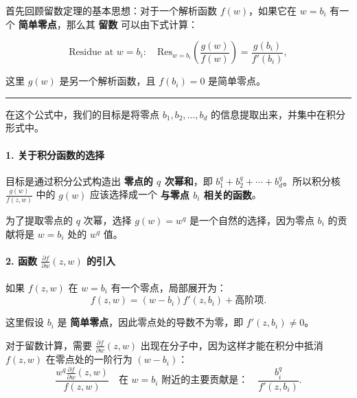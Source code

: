 \documentclass[lang=cn,zihao=-4,fontset=none,twoside]{fancybook}
\begin{document}
首先回顾留数定理的基本思想：对于一个解析函数 \(f(w)\)，如果它在
\(w = b_i\) 有一个 \textbf{简单零点}，那么其 \textbf{留数}
可以由下式计算：

\[
\text{Residue at } w = b_i: \quad \text{Res}_{w = b_i}\left(\frac{g(w)}{f(w)}\right) = \frac{g(b_i)}{f'(b_i)},
\]

这里 \(g(w)\) 是另一个解析函数，且 \(f(b_i) = 0\) 是简单零点。

\begin{center}\rule{0.5\linewidth}{0.5pt}\end{center}

在这个公式中，我们的目标是将零点 \(b_1, b_2, \dots, b_d\)
的信息提取出来，并集中在积分形式中。

\hypertarget{ux5173ux4e8eux79efux5206ux51fdux6570ux7684ux9009ux62e9}{%
\paragraph{1.
关于积分函数的选择}\label{ux5173ux4e8eux79efux5206ux51fdux6570ux7684ux9009ux62e9}}

目标是通过积分公式构造出 \textbf{零点的 \(q\) 次幂和}，即
\(b_1^q + b_2^q + \cdots + b_d^q\)。所以积分核 \(\frac{g(w)}{f(z, w)}\)
中的 \(g(w)\) 应该选择成一个 \textbf{与零点 \(b_i\) 相关的函数}。

为了提取零点的 \(q\) 次幂，选择 \(g(w) = w^q\)
是一个自然的选择，因为零点 \(b_i\) 的贡献将是 \(w = b_i\) 处的 \(w^q\)
值。

\hypertarget{ux51fdux6570-fracpartial-fpartial-wz-w-ux7684ux5f15ux5165}{%
\paragraph{\texorpdfstring{2. 函数
\(\frac{\partial f}{\partial w}(z, w)\)
的引入}{2. 函数 \textbackslash{}frac\{\textbackslash{}partial f\}\{\textbackslash{}partial w\}(z, w) 的引入}}\label{ux51fdux6570-fracpartial-fpartial-wz-w-ux7684ux5f15ux5165}}

如果 \(f(z, w)\) 在 \(w = b_i\) 有一个零点，局部展开为：
\[
f(z, w) = (w - b_i) f'(z, b_i) + \text{高阶项}.
\]

这里假设 \(b_i\) 是 \textbf{简单零点}，因此零点处的导数不为零，即
\(f'(z, b_i) \neq 0\)。

对于留数计算，需要 \(\frac{\partial f}{\partial w}(z, w)\)
出现在分子中，因为这样才能在积分中抵消 \(f(z, w)\) 在零点处的一阶行为
\((w - b_i)\)：
\[
\frac{w^q \frac{\partial f}{\partial w}(z, w)}{f(z, w)} \quad \text{在 } w = b_i \text{ 附近的主要贡献是：} \quad \frac{b_i^q}{f'(z, b_i)}.
\]
\end{document}
